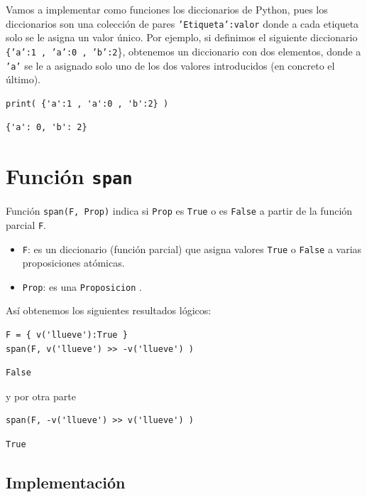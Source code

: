 \documentclass[10pt,a4paper]{report}
\begin{document}
Vamos a implementar como funciones los diccionarios de Python, pues los diccionarios son una colección de pares \texttt{'Etiqueta':valor} donde a cada etiqueta solo se le asigna un valor único. 
Por ejemplo, si definimos el siguiente diccionario \texttt{\{'a':1 , 'a':0 , 'b':2}\}, obtenemos un diccionario con dos elementos, donde a \texttt{'a'} se le a asignado solo uno de los dos valores introducidos (en concreto el último).
\begin{verbatim}
print( {'a':1 , 'a':0 , 'b':2} )
\end{verbatim}

\label{}
\begin{verbatim}
{'a': 0, 'b': 2}
\end{verbatim}
\section{Función \texttt{span}}
\label{sec:orgf9aaf21}

Función \texttt{span(F, Prop)} indica si \texttt{Prop} es \texttt{True} o es \texttt{False} a partir de la función parcial \texttt{F}.
\begin{itemize}
\item \texttt{F}: es un diccionario (función parcial) que asigna valores \texttt{True} o \texttt{False} a varias proposiciones atómicas.
\item \texttt{Prop}: es una \texttt{Proposicion} .
\end{itemize}
Así obtenemos los siguientes resultados lógicos:
\begin{verbatim}
F = { v('llueve'):True }
span(F, v('llueve') >> -v('llueve') )
\end{verbatim}

\label{}
\begin{verbatim}
False
\end{verbatim}

y por otra parte
\begin{verbatim}
span(F, -v('llueve') >> v('llueve') )
\end{verbatim}

\label{}
\begin{verbatim}
True
\end{verbatim}
\subsection{Implementación}
\label{sec:org448f3e3}
\end{document}
